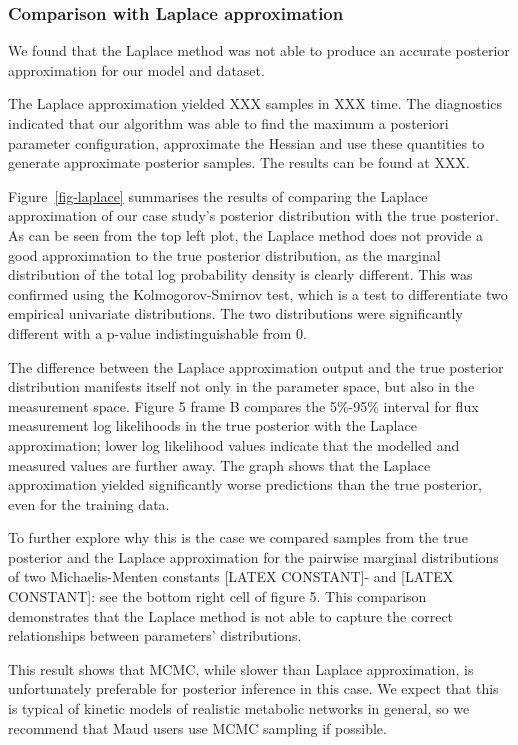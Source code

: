 \documentclass[
  letterpaper,
  DIV=11,
  numbers=noendperiod]{scrartcl}
\begin{document}
\hypertarget{comparison-with-laplace-approximation}{%
\subsubsection{Comparison with Laplace
approximation}\label{comparison-with-laplace-approximation}}

We found that the Laplace method was not able to produce an accurate
posterior approximation for our model and dataset.

The Laplace approximation yielded XXX samples in XXX time. The
diagnostics indicated that our algorithm was able to find the maximum a
posteriori parameter configuration, approximate the Hessian and use
these quantities to generate approximate posterior samples. The results
can be found at XXX.

Figure~\ref{fig-laplace} summarises the results of comparing the Laplace
approximation of our case study's posterior distribution with the true
posterior. As can be seen from the top left plot, the Laplace method
does not provide a good approximation to the true posterior
distribution, as the marginal distribution of the total log probability
density is clearly different. This was confirmed using the
Kolmogorov-Smirnov test, which is a test to differentiate two empirical
univariate distributions. The two distributions were significantly
different with a p-value indistinguishable from 0.

The difference between the Laplace approximation output and the true
posterior distribution manifests itself not only in the parameter space,
but also in the measurement space. Figure 5 frame B compares the
5\%-95\% interval for flux measurement log likelihoods in the true
posterior with the Laplace approximation; lower log likelihood values
indicate that the modelled and measured values are further away. The
graph shows that the Laplace approximation yielded significantly worse
predictions than the true posterior, even for the training data.

To further explore why this is the case we compared samples from the
true posterior and the Laplace approximation for the pairwise marginal
distributions of two Michaelis-Menten constants {[}LATEX CONSTANT{]}-
and {[}LATEX CONSTANT{]}: see the bottom right cell of figure 5. This
comparison demonstrates that the Laplace method is not able to capture
the correct relationships between parameters' distributions.

This result shows that MCMC, while slower than Laplace approximation, is
unfortunately preferable for posterior inference in this case. We expect
that this is typical of kinetic models of realistic metabolic networks
in general, so we recommend that Maud users use MCMC sampling if
possible.
\end{document}
